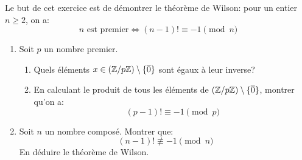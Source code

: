 \begin{td-exo} %
    Le but de cet exercice est de démontrer le théorème de Wilson:
    pour un entier \(n\geq 2\), on a:
    \begin{equation*}
        n\text{ est premier} \iff (n-1)!\equiv -1 \pmod{n}
    \end{equation*}
    \begin{enumerate}
        \item Soit \(p\) un nombre premier.
        \begin{enumerate}
            \item Quels éléments \(x\in(\mathbb{Z}/p\mathbb{Z})\setminus\{\overline{0}\}\) sont égaux à leur inverse?
            \item En calculant le produit de tous les éléments de \((\mathbb{Z}/p\mathbb{Z})\setminus\{\overline{0}\}\), montrer qu'on a:
            \begin{equation*}
                (p-1)!\equiv -1 \pmod{p}
            \end{equation*}
        \end{enumerate}
        \item Soit \(n\) un nombre composé. Montrer que:
        \begin{equation*}
            (n-1)!\not\equiv -1 \pmod{n}
        \end{equation*}
        En déduire le théorème de Wilson.
    \end{enumerate}
\end{td-exo}
